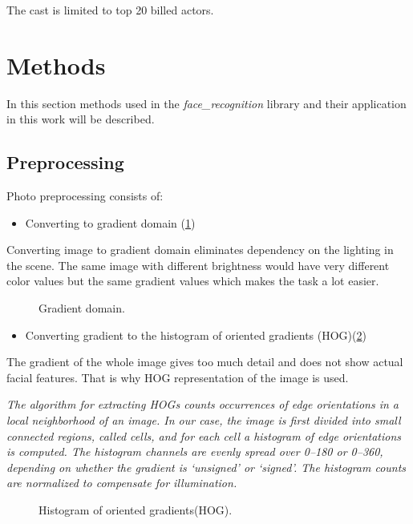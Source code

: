 \documentclass[hidelinks, english]{mvi-report}
\newcommand{\subimage}[3][1]{
\subfigure{
    \texttt{[image: \#2.\#3]}
}
}
\begin{document}
The cast is limited to top 20 billed actors.


\section{Methods}
\vbox{
In this section methods used in the \textit{face\_recognition} library and their application in this work will be described.
}
\subsection{Preprocessing}
Photo preprocessing consists of:

\begin{itemize}
\item Converting to gradient domain (\cref{fig:gradient})
\end{itemize}

Converting image to gradient domain eliminates dependency on the lighting in the scene. The same image with different
brightness would have very different color values but the same gradient values which makes the task a lot easier.

\begin{figure}[H]
    \centering
    \subimage[0.17]{original}{jpg}
    \subimage[0.03]{arrow}{png}
    \subimage[0.17]{gradient}{jpg}
    \caption{Gradient domain.}
    \label{fig:gradient}
\end{figure}

\begin{itemize}
\item Converting gradient to the histogram of oriented gradients (HOG)(\cref{fig:hog})
\end{itemize}

The gradient of the whole image gives too much detail and does not show actual facial features. That is why HOG
representation of the image is used.

\textit{The algorithm for extracting HOGs counts occurrences of edge orientations in a local neighborhood of an image.
In our case, the image is first divided into small connected regions, called cells, and for each cell a histogram of
edge orientations is computed. The histogram channels are evenly spread over 0–180 or 0–360, depending on whether
the gradient is ‘unsigned’ or ‘signed’. The histogram counts are normalized to compensate for illumination.}\cite{hog}


\begin{figure}[H]
    \centering
    \subimage[0.17]{gradient}{jpg}
    \subimage[0.03]{arrow}{png}
    \subimage[0.17]{hog}{jpg}
    \caption{Histogram of oriented gradients(HOG).}
    \label{fig:hog}
\end{figure}
\end{document}
